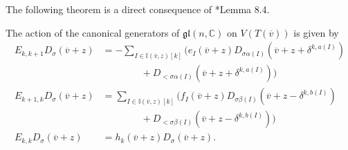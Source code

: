 \documentclass[11pt,fleqn]{amsart}
\newcommand\CC{\mathbb C}
\newcommand\gl{\mathfrak{gl}}
\newcommand\vv{\overline{v}}
\newcommand\II{\mathbb I}
\newcommand\D{\mathfrak D}
\begin{document}
The following theorem is a direct consequence of \cite{FGRZ18}*{Lemma 8.4}.
\begin{Theorem}
\label{T:gt-big-module}
The action of the canonical generators of $\gl(n,\CC)$ on $V(T(\vv))$ is given 
by
\begin{align*}
E_{k,k+1} D_\sigma(\vv + z) &= 
	 - \sum_{I \in \II(\vv,z)[k]} \bigg(
		e_I(\vv + z) D_{\sigma\alpha(I)}(\vv+z + \delta^{k,a(I)})\\
			&\qquad\qquad + D_{<\sigma\alpha(I)}(\vv+z + \delta^{k,a(I)})
			\bigg) \\
E_{k+1,k} D_\sigma(\vv + z) &=
	\sum_{I \in \II(\vv,z)[k]} \bigg(
		f_I(\vv + z) D_{\sigma\beta(I)}(\vv + z - \delta^{k,b(I)}) \\
			&\qquad\qquad
			+  D_{<\sigma\beta(I)}(\vv + z - \delta^{k,b(I)})
			\bigg)\\
E_{k,k} D_{\sigma}(\vv + z) 
	&= h_k(\vv + z) D_{\sigma}(\vv+z). 
\end{align*}
\end{Theorem}
\end{document}
